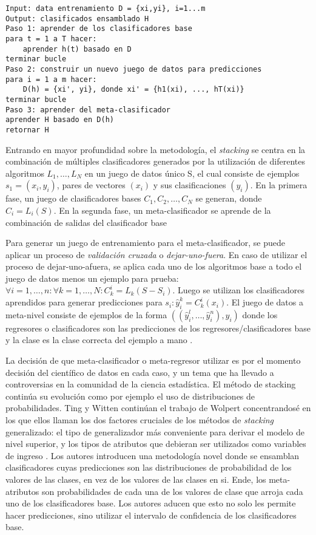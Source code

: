 \begin{spacing}{1.5}
\begin{lstlisting}
Input: data entrenamiento D = {xi,yi}, i=1...m
Output: clasificados ensamblado H
Paso 1: aprender de los clasificadores base
para t = 1 a T hacer:
	aprender h(t) basado en D
terminar bucle
Paso 2: construir un nuevo juego de datos para predicciones
para i = 1 a m hacer:
	D(h) = {xi', yi}, donde xi' = {h1(xi), ..., hT(xi)}
terminar bucle
Paso 3: aprender del meta-clasificador
aprender H basado en D(h)
retornar H
\end{lstlisting}

Entrando en mayor profundidad sobre la metodología, el \emph{stacking} se centra en la combinación de múltiples clasificadores generados por la utilización de diferentes algoritmos $L_1, \ldots, L_N$ en un juego de datos único S, el cual consiste de ejemplos $s_1 = (x_i, y_i)$, pares de vectores $(x_i)$ y sus clasificaciones $(y_i)$. En la primera fase, un juego de clasificadores bases $C_1, C_2, \ldots, C_N$ se generan, donde $C_i = L_i(S)$. En la segunda fase, un meta-clasificador se aprende de la combinación de salidas del clasificador base \cite{wolpert}

Para generar un juego de entrenamiento para el meta-clasificador, se puede aplicar un proceso de \emph{validación cruzada} o \emph{dejar-uno-fuera}. En caso de utilizar el proceso de dejar-uno-afuera, se aplica cada uno de los algoritmos base a todo el juego de datos menos un ejemplo para prueba: $\forall i = 1, \ldots, n : \forall k = 1, \ldots, N : C^{i}_{k} = L_k(S - S_i)$. Luego se utilizan los clasificadores aprendidos para generar predicciones para $s_i : \hat{y}^{k}_{i} = C^{i}_{k}(x_i)$. El juego de datos a meta-nivel consiste de ejemplos de la forma $((\hat{y}^{l}_{i}, \ldots, \hat{y}^{n}_{i}), y_i)$ donde los regresores o clasificadores son las predicciones de los regresores/clasificadores base y la clase es la clase correcta del ejemplo a mano \cite{DzeroskiZenko}.

La decisión de que meta-clasificador o meta-regresor utilizar es por el momento decisión del científico de datos en cada caso, y un tema que ha llevado a controversias en la comunidad de la ciencia estadística.  El método de stacking continúa su evolución como por ejemplo el uso de distribuciones de probabilidades. Ting y Witten continúan el trabajo de Wolpert concentrandosé en los que ellos llaman los dos factores cruciales de los métodos de \emph{stacking} generalizado: el tipo de generalizador más conveniente para derivar el modelo de nivel superior, y los tipos de atributos que debieran ser utilizados como variables de ingreso \cite{tingwitten}. Los autores introducen una metodología novel donde se ensamblan clasificadores cuyas predicciones son las distribuciones de probabilidad de los valores de las clases, en vez de los valores de las clases en si. Ende, los meta-atributos son probabilidades de cada una de los valores de clase que arroja cada uno de los clasificadores base. Los autores aducen que esto no solo les permite hacer predicciones, sino utilizar el intervalo de confidencia de los clasificadores base. 


\end{spacing}
